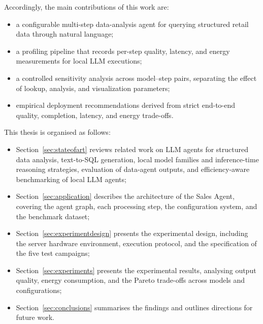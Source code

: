 \medskip
Accordingly, the main contributions of this work are:
\begin{itemize}
    \item a configurable multi-step data-analysis agent for querying structured retail
          data through natural language;
    \item a profiling pipeline that records per-step quality, latency, and energy
          measurements for local LLM executions;
    \item a controlled sensitivity analysis across model--step pairs, separating the
          effect of lookup, analysis, and visualization parameters;
    \item empirical deployment recommendations derived from strict end-to-end quality,
          completion, latency, and energy trade-offs.
\end{itemize}

\medskip
This thesis  is organised as follows:
\begin{itemize}
    \item Section~\ref{sec:stateofart} reviews related work on LLM agents for structured
          data analysis, text-to-SQL generation, local model families and inference-time
          reasoning strategies, evaluation of data-agent outputs, and efficiency-aware
          benchmarking of local LLM agents;
    \item Section~\ref{sec:application} describes the architecture of the Sales Agent,
          covering the agent graph, each processing step, the configuration system, and
          the benchmark dataset;
    \item Section~\ref{sec:experimentdesign} presents the experimental design, including
          the server hardware environment, execution protocol, and the specification
          of the five test campaigns;
    \item Section~\ref{sec:experiments} presents the experimental results, analysing
          output quality, energy consumption, and the Pareto trade-offs across models
          and configurations;
    \item Section~\ref{sec:conclusions} summarises the findings and outlines directions
          for future work.
\end{itemize}
